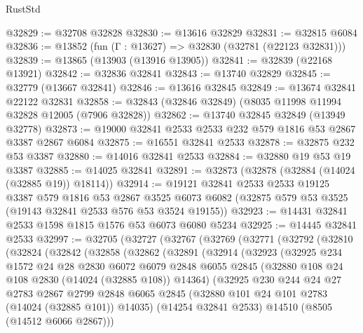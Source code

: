 \begin{lexlean}{RustStd}
\begin{coremodule}
@32829 := @32708 @32828
@32830 := @13616 @32829
@32831 := @32815 @6084
@32836 := @13852 (fun (Γ : @13627) => @32830 (@32781 (@22123 @32831)))
@32839 := @13865 (@13903 (@13916 @13905))
@32841 := @32839 (@22168 @13921)
@32842 := @32836 @32841
@32843 := @13740 @32829
@32845 := @32779 (@13667 @32841)
@32846 := @13616 @32845
@32849 := @13674 @32841 @22122 @32831
@32858 := @32843 (@32846 @32849) (@8035 @11998 @11994 @32828 @12005 (@7906 @32828))
@32862 := @13740 @32845 @32849 (@13949 @32778)
@32873 := @19000 @32841 @2533 @2533 @232 @579 @1816 @53 @2867 @3387 @2867 @6084
@32875 := @16551 @32841 @2533
@32878 := @32875 @232 @53 @3387
@32880 := @14016 @32841 @2533
@32884 := @32880 @19 @53 @19 @3387
@32885 := @14025 @32841
@32891 := @32873 (@32878 (@32884 (@14024 (@32885 @19)) @18114))
@32914 := @19121
    @32841
    @2533
    @2533
    @19125
    @3387
    @579
    @1816
    @53
    @2867
    @3525
    @6073
    @6082
    (@32875 @579 @53 @3525 (@19143 @32841 @2533 @576 @53 @3524 @19155))
@32923 := @14431 @32841 @2533 @1598 @1815 @1576 @53 @6073 @6080 @5234
@32925 := @14445 @32841 @2533
@32997 := @32705
    (@32727
      (@32767
        (@32769
          (@32771
            (@32792
              (@32810
                (@32824
                  (@32842
                    (@32858
                      (@32862
                        (@32891
                          (@32914
                            (@32923
                              (@32925
                                @234
                                @1572
                                @24
                                @28
                                @2830
                                @6072
                                @6079
                                @2848
                                @6055
                                @2845
                                (@32880 @108 @24 @108 @2830 (@14024 (@32885 @108)) @14364)
                                (@32925
                                  @230
                                  @244
                                  @24
                                  @27
                                  @2783
                                  @2867
                                  @2799
                                  @2848
                                  @6065
                                  @2845
                                  (@32880 @101 @24 @101 @2783 (@14024 (@32885 @101)) @14035)
                                  (@14254 @32841 @2533)
                                  @14510
                                  (@8505 (@14512 @6066 @2867)))

\end{coremodule}
\end{lexlean}
